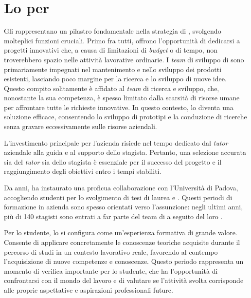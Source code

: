 \section{Lo \stage{} per \azienda}

Gli \stage{} rappresentano un pilastro fondamentale nella strategia di {\azienda}, svolgendo molteplici funzioni cruciali. 
Primo fra tutti, offrono l'opportunità di dedicarsi a progetti innovativi che, a causa di limitazioni di \textit{budget} o di tempo, 
non troverebbero spazio nelle attività lavorative ordinarie. I \textit{team} di sviluppo di {\azienda} sono primariamente impegnati 
nel mantenimento e nello sviluppo dei prodotti esistenti, lasciando poco margine per la ricerca e lo sviluppo di nuove idee. 
Questo compito solitamente è affidato al \textit{team} di ricerca e sviluppo, che, nonostante la sua competenza, è spesso limitato dalla scarsità 
di risorse umane per affrontare tutte le richieste innovative. In questo contesto, lo \stage{} diventa una soluzione efficace, 
consentendo lo sviluppo di prototipi e la conduzione di ricerche senza gravare eccessivamente sulle risorse aziendali.

L'investimento principale per l'azienda risiede nel tempo dedicato dal \textit{tutor} aziendale alla guida e al supporto dello stagista. 
Pertanto, una selezione accurata sia del \textit{tutor} sia dello stagista è essenziale per il successo del progetto e il raggiungimento 
degli obiettivi entro i tempi stabiliti.

\noindent Da anni, {\azienda} ha instaurato una proficua collaborazione con l'Università di Padova, accogliendo studenti per lo 
svolgimento di tesi di laurea e \stage. Questi periodi di formazione in azienda sono spesso orientati verso l'assunzione: negli 
ultimi anni, più di 140 stagisti sono entrati a far parte del team di {\azienda} a seguito del loro \stage.

Per lo studente, lo \stage{} si configura come un'esperienza formativa di grande valore. Consente di applicare concretamente le 
conoscenze teoriche acquisite durante il percorso di studi in un contesto lavorativo reale, favorendo al contempo l'acquisizione 
di nuove competenze e conoscenze. Questo periodo rappresenta un momento di verifica importante per lo studente, che ha l'opportunità 
di confrontarsi con il mondo del lavoro e di valutare se l'attività svolta corrisponde alle proprie aspettative e aspirazioni professionali future.

